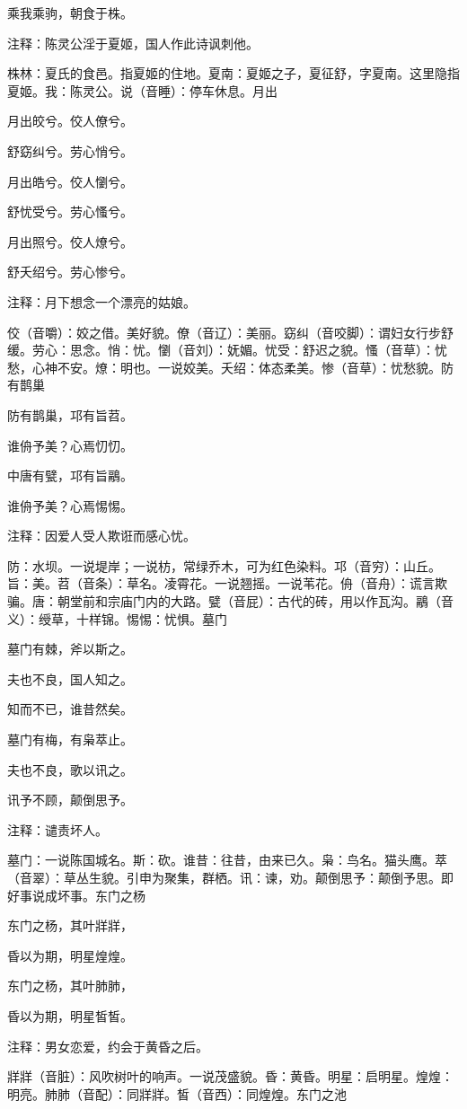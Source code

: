 \documentclass[12pt,UTF8]{ctexbook}
\begin{document}
乘我乘驹，朝食于株。

注释：陈灵公淫于夏姬，国人作此诗讽刺他。

株林：夏氏的食邑。指夏姬的住地。夏南：夏姬之子，夏征舒，字夏南。这里隐指夏姬。我：陈灵公。说（音睡）：停车休息。月出

月出皎兮。佼人僚兮。

舒窈纠兮。劳心悄兮。

月出皓兮。佼人懰兮。

舒忧受兮。劳心慅兮。

月出照兮。佼人燎兮。

舒夭绍兮。劳心惨兮。

注释：月下想念一个漂亮的姑娘。

佼（音嚼）：姣之借。美好貌。僚（音辽）：美丽。窈纠（音咬脚）：谓妇女行步舒缓。劳心：思念。悄：忧。懰（音刘）：妩媚。忧受：舒迟之貌。慅（音草）：忧愁，心神不安。燎：明也。一说姣美。夭绍：体态柔美。惨（音草）：忧愁貌。防有鹊巢

防有鹊巢，邛有旨苕。

谁侜予美？心焉忉忉。

中唐有甓，邛有旨鷊。

谁侜予美？心焉惕惕。

注释：因爱人受人欺诳而感心忧。

防：水坝。一说堤岸；一说枋，常绿乔木，可为红色染料。邛（音穷）：山丘。旨：美。苕（音条）：草名。凌霄花。一说翘摇。一说苇花。侜（音舟）：谎言欺骗。唐：朝堂前和宗庙门内的大路。甓（音屁）：古代的砖，用以作瓦沟。鷊（音义）：绶草，十样锦。惕惕：忧惧。墓门

墓门有棘，斧以斯之。

夫也不良，国人知之。

知而不已，谁昔然矣。

墓门有梅，有枭萃止。

夫也不良，歌以讯之。

讯予不顾，颠倒思予。

注释：谴责坏人。

墓门：一说陈国城名。斯：砍。谁昔：往昔，由来已久。枭：鸟名。猫头鹰。萃（音翠）：草丛生貌。引申为聚集，群栖。讯：谏，劝。颠倒思予：颠倒予思。即好事说成坏事。东门之杨

东门之杨，其叶牂牂，

昏以为期，明星煌煌。

东门之杨，其叶肺肺，

昏以为期，明星皙皙。

注释：男女恋爱，约会于黄昏之后。

牂牂（音脏）：风吹树叶的响声。一说茂盛貌。昏：黄昏。明星：启明星。煌煌：明亮。肺肺（音配）：同牂牂。皙（音西）：同煌煌。东门之池
\end{document}
